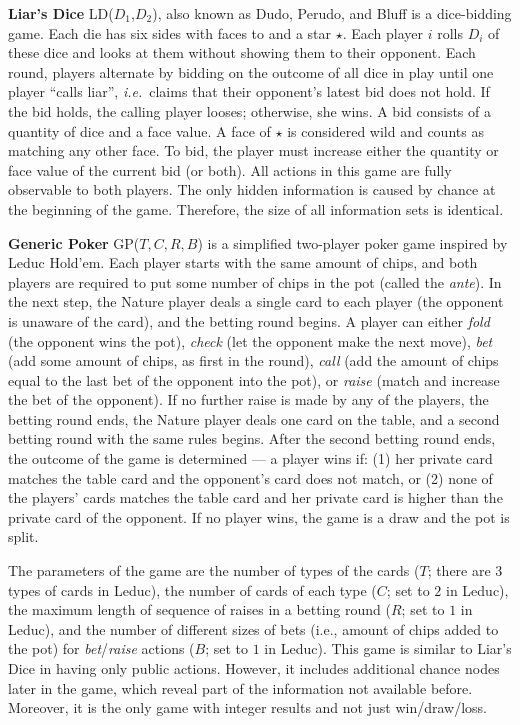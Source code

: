 \documentclass{aamas2015}
\newcommand{\ie}{{\it i.e.}~}
\begin{document}
\textbf{Liar's Dice} LD($D_1$,$D_2$), also known as Dudo, Perudo, and Bluff is a dice-bidding game. 
Each die has six sides with faces  to  and a star $\star$. 
Each player $i$ rolls $D_i$ of these dice and looks at them without showing them to their opponent. 
Each round, players alternate by bidding on the outcome of all dice in play until one player ``calls liar'', 
\ie claims that their opponent's latest bid does not hold.
If the bid holds, the calling player looses; otherwise, she wins.
A bid consists of a quantity of dice and a face value.  
A face of $\star$ is considered wild and counts as matching any other face.
To bid, the player must increase either the quantity or face value of the current 
bid (or both).
All actions in this game are fully observable to both players. The only hidden information is caused by chance at the beginning of the game. Therefore, the size of all information sets is identical. 


\textbf{Generic Poker} GP($T,C,R,B$) is a simplified two-player poker game inspired by Leduc Hold'em. Each player starts with the same amount of chips, and both players are required to put some number of chips in the pot (called the \emph{ante}).
In the next step, the Nature player deals a single card to each player (the opponent is unaware of the card), and the betting round begins.
A player can either \emph{fold} (the opponent wins the pot), \emph{check} (let the opponent make the next move), \emph{bet} (add some amount of chips, as first in the round), \emph{call} (add the amount of chips equal to the last bet of the opponent into the pot), or \emph{raise} (match and increase the bet of the opponent).
If no further raise is made by any of the players, the betting round ends, the Nature player deals one card on the table, and a second betting round with the same rules begins.
After the second betting round ends, the outcome of the game is determined --- a player wins if: (1) her private card matches the table card and the opponent's card does not match, or (2) none of the players' cards matches the table card and her private card is higher than the private card of the opponent. If no player wins, the game is a draw and the pot is split.

The parameters of the game are the number of types of the cards ($T$; there are $3$ types of cards in Leduc), the number of cards of each type ($C$; set to $2$ in Leduc), the maximum length of sequence of raises in a betting round ($R$; set to $1$ in Leduc), and the number of different sizes of bets (i.e., amount of chips added to the pot) for \emph{bet}/\emph{raise} actions ($B$; set to $1$ in Leduc).
This game is similar to Liar's Dice in having only public actions. However, it includes additional chance nodes later in the game, which reveal part of the information not available before. Moreover, it is the only game with integer results and not just win/draw/loss.
\end{document}
